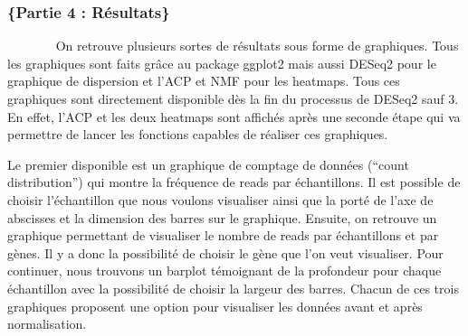 \documentclass[
  12pt,
]{article}
\begin{document}
\hypertarget{partie-4-ruxe9sultats}{%
\subsubsection{\texorpdfstring{\normalsize\{Partie 4 :
Résultats\}}{\{Partie 4 : Résultats\}}}\label{partie-4-ruxe9sultats}}

~~~~~~~ On retrouve plusieurs sortes de résultats sous forme de
graphiques. Tous les graphiques sont faits grâce au package ggplot2 mais
aussi DESeq2 pour le graphique de dispersion et l'ACP et NMF pour les
heatmaps. Tous ces graphiques sont directement disponible dès la fin du
processus de DESeq2 sauf 3. En effet, l'ACP et les deux heatmaps sont
affichés après une seconde étape qui va permettre de lancer les
fonctions capables de réaliser ces graphiques.

\par

Le premier disponible est un graphique de comptage de données (``count
distribution'') qui montre la fréquence de reads par échantillons. Il
est possible de choisir l'échantillon que nous voulons visualiser ainsi
que la porté de l'axe de abscisses et la dimension des barres sur le
graphique. Ensuite, on retrouve un graphique permettant de visualiser le
nombre de reads par échantillons et par gènes. Il y a donc la
possibilité de choisir le gène que l'on veut visualiser. Pour continuer,
nous trouvons un barplot témoignant de la profondeur pour chaque
échantillon avec la possibilité de choisir la largeur des barres. Chacun
de ces trois graphiques proposent une option pour visualiser les données
avant et après normalisation.

\singlespacing
\end{document}
